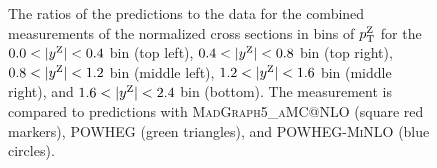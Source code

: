 \begin{figure}
	\caption{The ratios of the predictions to the data for the combined measurements of the normalized cross sections in bins of $p_{\mathrm{T}}^{\mathrm{Z}}$ for the 
	$0.0 < |y^{\mathrm{Z}}| < 0.4$ bin (top left), $0.4 < |y^{\mathrm{Z}}| < 0.8$ bin (top right),
	$0.8 < |y^{\mathrm{Z}}| < 1.2$ bin (middle left), $1.2 < |y^{\mathrm{Z}}| < 1.6$ bin (middle right), and $1.6 < |y^{\mathrm{Z}}| < 2.4$ bin (bottom). The measurement is compared to predictions with \textsc{MadGraph5\_aMC@NLO} (square red markers),  \textsc{POWHEG} (green triangles), and \textsc{POWHEG-MiNLO} (blue circles).}
	\label{fig:zll_double_norm}
\end{figure}


